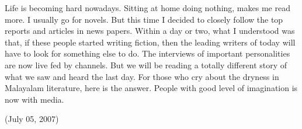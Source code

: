 \vskip 2pt

{\engtext
Life is becoming hard nowadays. Sitting at home doing nothing, makes me read more.
I usually go for novels. But this time I decided to closely follow the top 
reports and articles in news papers. Within a day or two, 
what I understood was that, if these people started writing fiction, then the 
leading writers of today will have to look for something else to do. The interviews of 
important personalities are now live fed by channels. But we will be reading
 a totally different story of what we saw and heard the last day.
For those who cry about the dryness in Malayalam literature, here is the answer. 
People with good level of imagination is now with media.

(July 05, 2007)
}
\newpage
